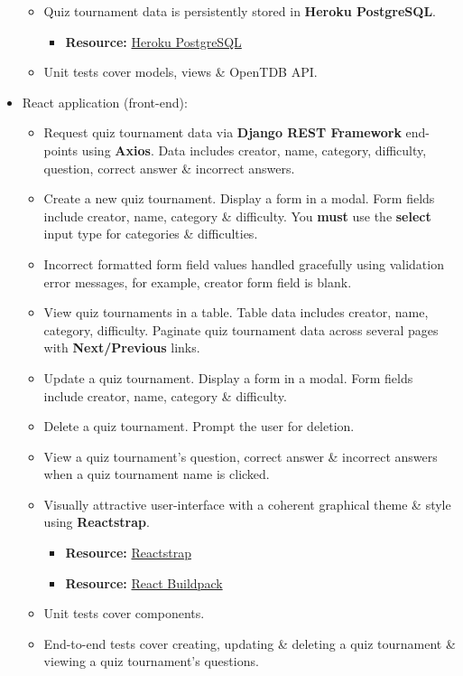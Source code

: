 \documentclass{article}
\begin{document}
\begin{itemize}
\begin{itemize}
		\item Quiz tournament data is persistently stored in \textbf{Heroku PostgreSQL}.
		\begin{itemize}
			\item \textbf{Resource:} \href{https://www.heroku.com/postgres}{Heroku PostgreSQL}
		\end{itemize}
		\item Unit tests cover models, views \& OpenTDB API.
	\end{itemize}
	\item React application (front-end):
	\begin{itemize}
		\item Request quiz tournament data via \textbf{Django REST Framework} end-points using \textbf{Axios}. Data includes creator, name, category, difficulty, question, correct answer \& incorrect answers. 
		\item Create a new quiz tournament. Display a form in a modal. Form fields include creator, name, category \& difficulty. You \textbf{must} use the \textbf{select} input type for categories \& difficulties.  
		\item Incorrect formatted form field values handled gracefully using validation error messages, for example, creator form field is blank.
		\item View quiz tournaments in a table. Table data includes creator, name, category, difficulty. Paginate quiz tournament data across several pages with \textbf{Next/Previous} links.
		\item Update a quiz tournament. Display a form in a modal. Form fields include creator, name, category \& difficulty.
		\item Delete a quiz tournament. Prompt the user for deletion.
		\item View a quiz tournament's question, correct answer \& incorrect answers when a quiz tournament name is clicked. 
		\item Visually attractive user-interface with a coherent graphical theme \& style using \textbf{Reactstrap}.
		\begin{itemize}
			\item \textbf{Resource:} \href{https://reactstrap.github.io/}{Reactstrap}
		\end{itemize}
		\begin{itemize}
			\item \textbf{Resource:} \href{https://github.com/mars/create-react-app-buildpack}{React Buildpack}
		\end{itemize}
		\item Unit tests cover components.
		\item End-to-end tests cover creating, updating \& deleting a quiz tournament \& viewing a quiz tournament’s questions.
	\end{itemize}
\end{itemize}
\end{document}

